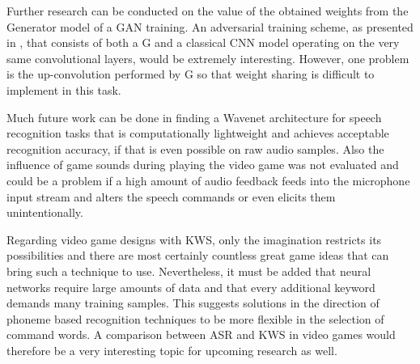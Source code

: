 Further research can be conducted on the value of the obtained weights from the Generator model of a GAN training. 
An adversarial training scheme, as presented in \cite{Oezdenizci2020EEG}, that consists of both a G and a classical CNN model operating on the very same convolutional layers, would be extremely interesting. 
However, one problem is the up-convolution performed by G so that weight sharing is difficult to implement in this task.

Much future work can be done in finding a Wavenet architecture for speech recognition tasks that is computationally lightweight and achieves acceptable recognition accuracy, if that is even possible on raw audio samples.
Also the influence of game sounds during playing the video game was not evaluated and could be a problem if a high amount of audio feedback feeds into the microphone input stream and alters the speech commands or even elicits them unintentionally.

Regarding video game designs with KWS, only the imagination restricts its possibilities and there are most certainly countless great game ideas that can bring such a technique to use.
Nevertheless, it must be added that neural networks require large amounts of data and that every additional keyword demands many training samples.
This suggests solutions in the direction of phoneme based recognition techniques to be more flexible in the selection of command words.
A comparison between ASR and KWS in video games would therefore be a very interesting topic for upcoming research as well.